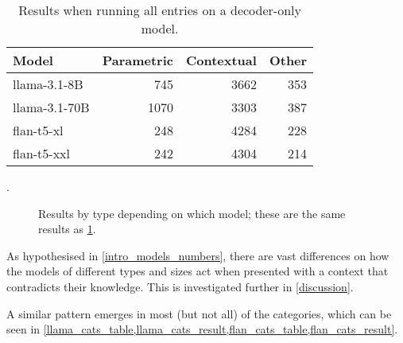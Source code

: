 \begin{table}[htbp]
	\centering
	\footnotesize
	\begin{tabular}{l r r r}
		\toprule
			\bfseries Model & \bfseries Parametric & \bfseries Contextual & \bfseries Other \\
		\midrule
			\ttfamily llama-3.1-8B & 745 & 3662 & 353 \\
			\ttfamily llama-3.1-70B & 1070 & 3303 & 387 \\
		\midrule
			\ttfamily flan-t5-xl  & 248 & 4284 & 228 \\
			\ttfamily flan-t5-xxl & 242 & 4304 & 214 \\
		\bottomrule
	\end{tabular}
	\caption{Results when running all entries on a decoder-only model.}
	\label{total_table}.
\end{table}

\begin{figure}[H]
	\centering
	\caption{Results by type depending on which model; these are the same results as \cref{total_table}.}
	\label{total_results}
\end{figure}

As hypothesised in \cref{intro_models_numbers}, there are vast differences on how the models of different types and sizes act when presented with a context that contradicts their knowledge.
This is investigated further in \cref{discussion}.

A similar pattern emerges in most (but not all) of the categories, which can be seen in \cref{llama_cats_table,llama_cats_result,flan_cats_table,flan_cats_result}.

